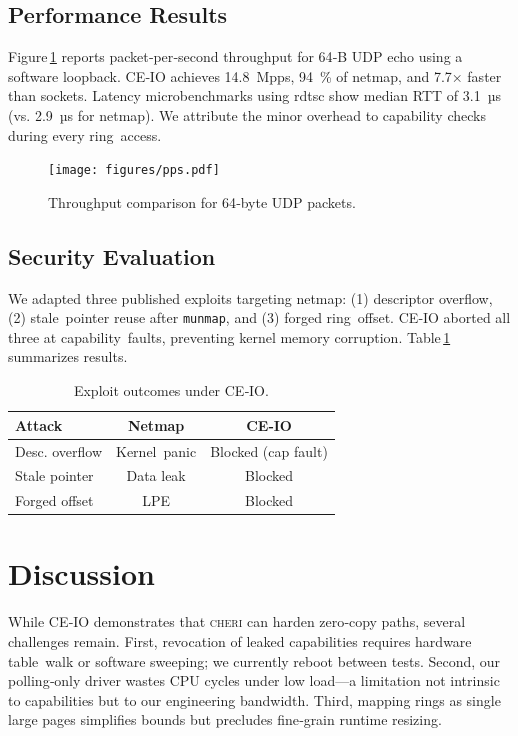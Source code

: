 \documentclass[sigconf]{acmart}
\newcommand{\cheri}{\textsc{cheri}\xspace}
\begin{document}
\subsection{Performance Results}
Figure\,\ref{fig:pps} reports packet‑per‑second throughput for 64‑B UDP echo using a software loopback. CE‑IO achieves 14.8 Mpps, 94 \% of netmap, and 7.7× faster than sockets. Latency microbenchmarks using rdtsc show median RTT of 3.1 µs (vs. 2.9 µs for netmap). We attribute the minor overhead to capability checks during every ring access.

\begin{figure}[t]
  \centering
  \texttt{[image: figures/pps.pdf]}
  \caption{Throughput comparison for 64‑byte UDP packets.}
  \label{fig:pps}
\end{figure}

\subsection{Security Evaluation}
We adapted three published exploits targeting netmap: (1) descriptor overflow, (2) stale pointer reuse after \texttt{munmap}, and (3) forged ring offset. CE‑IO aborted all three at capability faults, preventing kernel memory corruption. Table\,\ref{tab:attacks} summarizes results.

\begin{table}[h]
  \caption{Exploit outcomes under CE‑IO.}
  \label{tab:attacks}
  \begin{tabular}{lcc}
    \toprule
    Attack & Netmap & CE‑IO \\
    \midrule
    Desc. overflow & Kernel panic & Blocked (cap fault) \\
    Stale pointer  & Data leak   & Blocked \\
    Forged offset  & LPE         & Blocked \\
    \bottomrule
  \end{tabular}
\end{table}

\section{Discussion}
\label{sec:discussion}
While CE‑IO demonstrates that \cheri can harden zero‑copy paths, several challenges remain. First, revocation of leaked capabilities requires hardware table walk or software sweeping; we currently reboot between tests. Second, our polling‑only driver wastes CPU cycles under low load—a limitation not intrinsic to capabilities but to our engineering bandwidth. Third, mapping rings as single large pages simplifies bounds but precludes fine‑grain runtime resizing.
\end{document}
